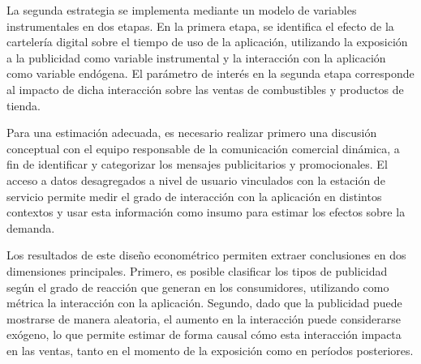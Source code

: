 La segunda estrategia se implementa mediante un modelo de variables instrumentales en dos etapas. En la primera etapa, se identifica el efecto de la cartelería digital sobre el tiempo de uso de la aplicación, utilizando la exposición a la publicidad como variable instrumental y la interacción con la aplicación como variable endógena. El parámetro de interés en la segunda etapa corresponde al impacto de dicha interacción sobre las ventas de combustibles y productos de tienda.

Para una estimación adecuada, es necesario realizar primero una discusión conceptual con el equipo responsable de la comunicación comercial dinámica, a fin de identificar y categorizar los mensajes publicitarios y promocionales. El acceso a datos desagregados a nivel de usuario vinculados con la estación de servicio permite medir el grado de interacción con la aplicación en distintos contextos y usar esta información como insumo para estimar los efectos sobre la demanda.

Los resultados de este diseño econométrico permiten extraer conclusiones en dos dimensiones principales. Primero, es posible clasificar los tipos de publicidad según el grado de reacción que generan en los consumidores, utilizando como métrica la interacción con la aplicación. Segundo, dado que la publicidad puede mostrarse de manera aleatoria, el aumento en la interacción puede considerarse exógeno, lo que permite estimar de forma causal cómo esta interacción impacta en las ventas, tanto en el momento de la exposición como en períodos posteriores.













